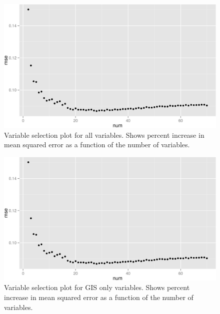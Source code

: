\documentclass[11pt,]{article}
\begin{document}
\begin{figure}[htbp]
\centering
\includegraphics{manuscript_files/figure-latex/all_var_sel_figure-1.jpeg}
\caption{Variable selection plot for all variables. Shows percent
increase in mean squared error as a function of the number of variables.
\label{fig:all_varsel_figure}}
\end{figure}

\newpage

\newpage

\newpage

\newpage

\begin{figure}[htbp]
\centering
\includegraphics{manuscript_files/figure-latex/gis_var_sel_figure-1.jpeg}
\caption{Variable selection plot for GIS only variables. Shows percent
increase in mean squared error as a function of the number of variables.
\label{fig:gis_varsel_figure}}
\end{figure}

\newpage

\newpage
\end{document}
